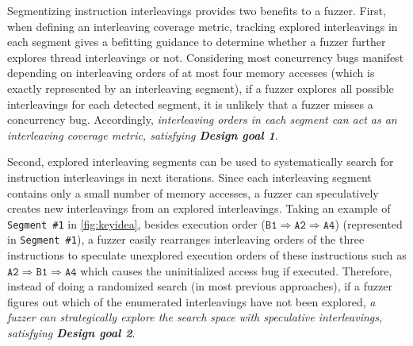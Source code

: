 



%
Segmentizing instruction interleavings provides two 
benefits to a fuzzer.
%
First, when defining an interleaving coverage metric, tracking
explored interleavings in each segment gives a befitting guidance to
determine whether a fuzzer further explores thread interleavings or
not.
%
%
Considering most concurrency bugs manifest depending on interleaving
orders of at most four memory accesses (which is exactly represented
by an interleaving segment), 
if a fuzzer explores all possible interleavings for each detected segment,
it is unlikely that a fuzzer misses a concurrency bug.
%
Accordingly, \textit{interleaving orders in each segment can act as an
interleaving coverage metric, satisfying \textbf{Design goal 1}}.







Second, explored interleaving segments can be used to
systematically search for instruction interleavings in next 
iterations.
%
Since each interleaving segment contains only a small number of memory
accesses, a fuzzer can speculatively creates new interleavings
from an explored interleavings.
Taking an example of \texttt{Segment \#1} in \autoref{fig:keyidea},
besides execution order
($\texttt{B1} \Rightarrow \texttt{A2} \Rightarrow \texttt{A4}$)
(represented in \texttt{Segment \#1}), a fuzzer easily rearranges
interleaving orders of the three instructions to speculate 
unexplored execution orders of these instructions such as
$\texttt{A2} \Rightarrow \texttt{B1} \Rightarrow \texttt{A4}$ which
causes the uninitialized access bug if executed.
Therefore, instead of doing a randomized search (in most previous approaches), if a fuzzer figures out which of the enumerated interleavings have not been explored, \textit{a fuzzer can strategically 
explore the search space with speculative interleavings, 
satisfying \textbf{Design goal 2}}.


